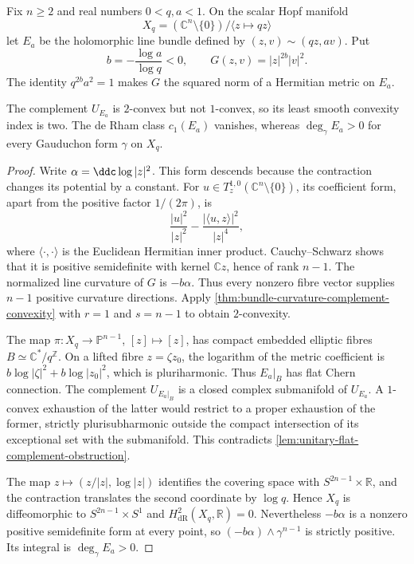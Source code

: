 Fix $n\geq2$ and real numbers $0<q,a<1$. On the scalar Hopf manifold
\[
 X_q=(\mathbb C^n\setminus\{0\})/\langle z\mapsto qz\rangle
\]
let $E_a$ be the holomorphic line bundle defined by $(z,v)\sim(qz,av)$. Put
\[
 b=-\frac{\log a}{\log q}<0,
 \qquad G(z,v)=|z|^{2b}|v|^2.
\]
The identity $q^{2b}a^2=1$ makes $G$ the squared norm of a Hermitian metric on $E_a$.

\begin{example}\label{ex:hopf-exact-complement-index}
The complement $U_{E_a}$ is $2$-convex but not $1$-convex, so its least smooth convexity index is two. The de Rham class $c_1(E_a)$ vanishes, whereas $\deg_\gamma E_a>0$ for every Gauduchon form $\gamma$ on $X_q$.
\end{example}
\begin{proof}
Write $\alpha=\ddc\log|z|^2$. This form descends because the contraction changes its potential by a constant. For $u\in T_z^{1,0}(\mathbb C^n\setminus\{0\})$, its coefficient form, apart from the positive factor $1/(2\pi)$, is
\[
 \frac{|u|^2}{|z|^2}-\frac{|\langle u,z\rangle|^2}{|z|^4},
\]
where $\langle\cdot,\cdot\rangle$ is the Euclidean Hermitian inner product. Cauchy--Schwarz shows that it is positive semidefinite with kernel $\mathbb Cz$, hence of rank $n-1$. The normalized line curvature of $G$ is $-b\alpha$. Thus every nonzero fibre vector supplies $n-1$ positive curvature directions. Apply \cref{thm:bundle-curvature-complement-convexity} with $r=1$ and $s=n-1$ to obtain $2$-convexity.

The map $\pi:X_q\to\mathbb P^{n-1}$, $[z]\mapsto[z]$, has compact embedded elliptic fibres $B\simeq\mathbb C^*/q^{\mathbb Z}$. On a lifted fibre $z=\zeta z_0$, the logarithm of the metric coefficient is $b\log|\zeta|^2+b\log|z_0|^2$, which is pluriharmonic. Thus $E_a|_B$ has flat Chern connection. The complement $U_{E_a|_B}$ is a closed complex submanifold of $U_{E_a}$. A $1$-convex exhaustion of the latter would restrict to a proper exhaustion of the former, strictly plurisubharmonic outside the compact intersection of its exceptional set with the submanifold. This contradicts \cref{lem:unitary-flat-complement-obstruction}.

The map $z\mapsto(z/|z|,\log|z|)$ identifies the covering space with $S^{2n-1}\times\mathbb R$, and the contraction translates the second coordinate by $\log q$. Hence $X_q$ is diffeomorphic to $S^{2n-1}\times S^1$ and $H^2_{\mathrm{dR}}(X_q,\mathbb R)=0$. Nevertheless $-b\alpha$ is a nonzero positive semidefinite form at every point, so $(-b\alpha)\wedge\gamma^{n-1}$ is strictly positive. Its integral is $\deg_\gamma E_a>0$.
\end{proof}
